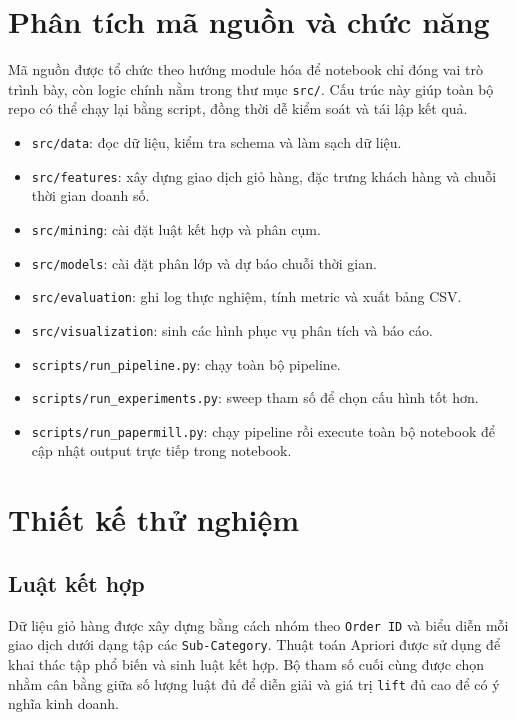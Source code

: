 \section{Phân tích mã nguồn và chức năng}

Mã nguồn được tổ chức theo hướng module hóa để notebook chỉ đóng vai trò trình bày, còn logic chính nằm trong thư mục \texttt{src/}. Cấu trúc này giúp toàn bộ repo có thể chạy lại bằng script, đồng thời dễ kiểm soát và tái lập kết quả.

\begin{itemize}
\item \texttt{src/data}: đọc dữ liệu, kiểm tra schema và làm sạch dữ liệu.
\item \texttt{src/features}: xây dựng giao dịch giỏ hàng, đặc trưng khách hàng và chuỗi thời gian doanh số.
\item \texttt{src/mining}: cài đặt luật kết hợp và phân cụm.
\item \texttt{src/models}: cài đặt phân lớp và dự báo chuỗi thời gian.
\item \texttt{src/evaluation}: ghi log thực nghiệm, tính metric và xuất bảng CSV.
\item \texttt{src/visualization}: sinh các hình phục vụ phân tích và báo cáo.
\item \texttt{scripts/run\_pipeline.py}: chạy toàn bộ pipeline.
\item \texttt{scripts/run\_experiments.py}: sweep tham số để chọn cấu hình tốt hơn.
\item \texttt{scripts/run\_papermill.py}: chạy pipeline rồi execute toàn bộ notebook để cập nhật output trực tiếp trong notebook.
\end{itemize}

\section{Thiết kế thử nghiệm}

\subsection{Luật kết hợp}

Dữ liệu giỏ hàng được xây dựng bằng cách nhóm theo \texttt{Order ID} và biểu diễn mỗi giao dịch dưới dạng tập các \texttt{Sub-Category}. Thuật toán Apriori được sử dụng để khai thác tập phổ biến và sinh luật kết hợp. Bộ tham số cuối cùng được chọn nhằm cân bằng giữa số lượng luật đủ để diễn giải và giá trị \texttt{lift} đủ cao để có ý nghĩa kinh doanh.

